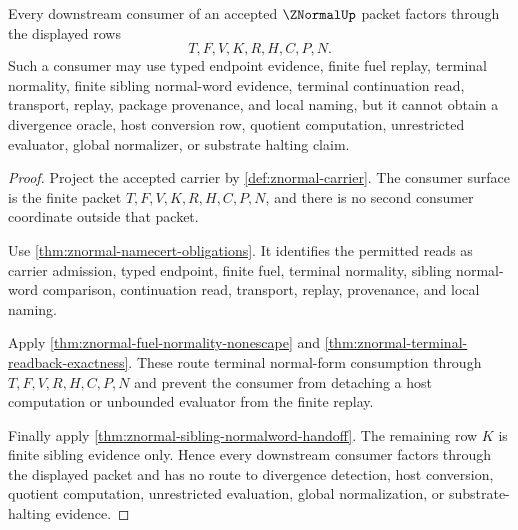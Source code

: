 \begin{theorem}
\label{thm:znormal-consumer-divergence-oracle-nonescape}
Every downstream consumer of an accepted $\ZNormalUp$ packet factors through
the displayed rows
$$
T,F,V,K,R,H,C,P,N.
$$
Such a consumer may use typed endpoint evidence, finite fuel replay, terminal
normality, finite sibling normal-word evidence, terminal continuation read,
transport, replay, package provenance, and local naming, but it cannot obtain
a divergence oracle, host conversion row, quotient computation, unrestricted
evaluator, global normalizer, or substrate halting claim.
\end{theorem}
\begin{proof}
Project the accepted carrier by \autoref{def:znormal-carrier}. The consumer
surface is the finite packet $T,F,V,K,R,H,C,P,N$, and there is no second
consumer coordinate outside that packet.

Use \autoref{thm:znormal-namecert-obligations}. It identifies the permitted
reads as carrier admission, typed endpoint, finite fuel, terminal normality,
sibling normal-word comparison, continuation read, transport, replay,
provenance, and local naming.

Apply \autoref{thm:znormal-fuel-normality-nonescape} and
\autoref{thm:znormal-terminal-readback-exactness}. These route terminal
normal-form consumption through $T,F,V,R,H,C,P,N$ and prevent the consumer from
detaching a host computation or unbounded evaluator from the finite replay.

Finally apply \autoref{thm:znormal-sibling-normalword-handoff}. The remaining
row $K$ is finite sibling evidence only. Hence every downstream consumer
factors through the displayed packet and has no route to divergence detection,
host conversion, quotient computation, unrestricted evaluation, global
normalization, or substrate-halting evidence.
\end{proof}
